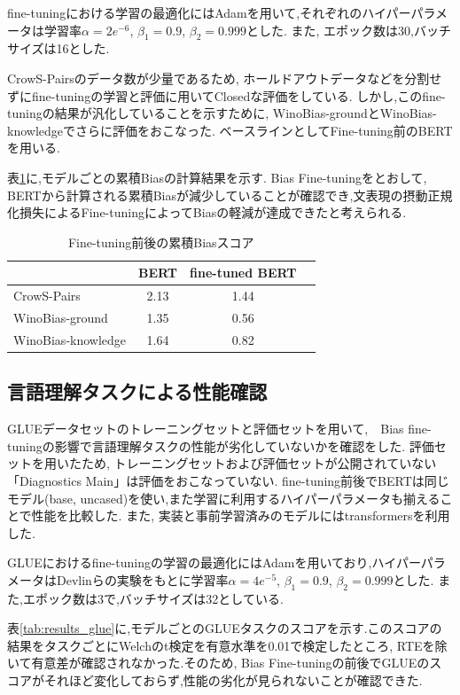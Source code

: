 \documentclass[
  platex, dvipdfmx %
]{nlp2021}
\begin{document}
fine-tuningにおける学習の最適化にはAdamを用いて,それぞれのハイパーパラメータは学習率$\alpha = 2e^{-6}$, $\beta_1 = 0.9$, $\beta_2 = 0.999$とした.
また, エポック数は30,バッチサイズは16とした.

CrowS-Pairsのデータ数が少量であるため, ホールドアウトデータなどを分割せずにfine-tuningの学習と評価に用いてClosedな評価をしている.
しかし,このfine-tuningの結果が汎化していることを示すために, WinoBias-groundとWinoBias-knowledgeでさらに評価をおこなった.
ベースラインとしてFine-tuning前のBERTを用いる.

表\ref{tab:results_bias}に,モデルごとの累積Biasの計算結果を示す.
Bias Fine-tuningをとおして, BERTから計算される累積Biasが減少していることが確認でき,文表現の摂動正規化損失によるFine-tuningによってBiasの軽減が達成できたと考えられる.

\begin{table}[h]
\centering
\label{tab:results_bias}
\begin{tabular}{lccc}
\hline
 &  BERT & fine-tuned BERT \\
\hline
CrowS-Pairs & 2.13 &  1.44 \\
WinoBias-ground & 1.35 &  0.56  \\
WinoBias-knowledge & 1.64 & 0.82 \\
\hline
\end{tabular}
\caption{Fine-tuning前後の累積Biasスコア}
\end{table}

\subsection{言語理解タスクによる性能確認}
GLUEデータセットのトレーニングセットと評価セットを用いて,　Bias fine-tuningの影響で言語理解タスクの性能が劣化していないかを確認をした.
評価セットを用いたため, トレーニングセットおよび評価セットが公開されていない「Diagnostics Main」は評価をおこなっていない.
fine-tuning前後でBERTは同じモデル(base, uncased)を使い,また学習に利用するハイパーパラメータも揃えることで性能を比較した.
また, 実装と事前学習済みのモデルにはtransformers\cite{wolf-etal-2020-transformers}を利用した.

GLUEにおけるfine-tuningの学習の最適化にはAdamを用いており,ハイパーパラメータはDevlinら\cite{devlin2018bert}の実験をもとに学習率$\alpha = 4e^{-5}$, $\beta_1 = 0.9$, $\beta_2 = 0.999$とした.
また,エポック数は3で,バッチサイズは32としている.

表\ref{tab:results_glue}に,モデルごとのGLUEタスクのスコアを示す.このスコアの結果をタスクごとにWelchのt検定を有意水準を0.01で検定したところ, RTEを除いて有意差が確認されなかった.そのため, Bias Fine-tuningの前後でGLUEのスコアがそれほど変化しておらず,性能の劣化が見られないことが確認できた.
\end{document}
